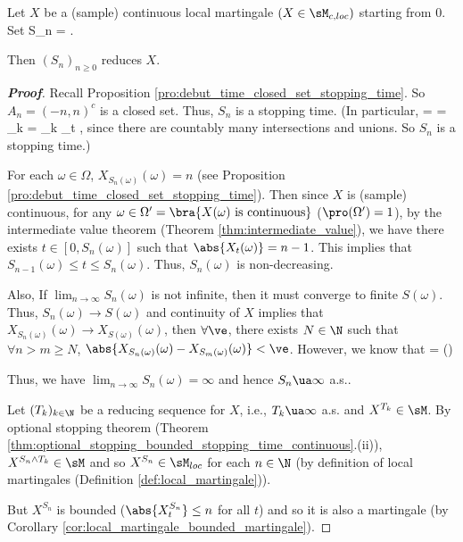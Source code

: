 \begin{proposition}\label{pro:continuous_local_martingale_stopping_time}
Let $X$ be a (sample) continuous local martingale $(X \in \sM_{c,loc})$ starting from 0. Set
\be
S_n = \inf{}.
\ee

Then $(S_n)_{n\geq 0}$ reduces $X$.
\end{proposition}

\begin{proof}[\bf Proof]
Recall Proposition \ref{pro:debut_time_closed_set_stopping_time}. So $A_n = (-n, n)^c$ is a closed set. Thus, $S_n$ is a stopping time. (In particular,
\be
{} =  = \bigcap_{k\in \N}  = \bigcap_{k\in \N}  \in \sF_t ,
\ee
since there are countably many intersections and unions. So $S_n$ is a stopping time.)

For each $\omega\in \Omega$, $X_{S_n(\omega)}(\omega) = n$ (see Proposition \ref{pro:debut_time_closed_set_stopping_time}). Then since $X$ is (sample) continuous, for any $\omega \in \Omega' = \bra{X(\omega)\text{ is continuous}}$ ($\pro(\Omega') = 1$), by the intermediate value theorem (Theorem \ref{thm:intermediate_value}), we have there exists $t\in [0,S_n(\omega)]$ such that $\abs{X_t(\omega)} = n-1$. This implies that $S_{n-1}(\omega)\leq t\leq S_n(\omega)$. Thus, $S_n(\omega)$ is non-decreasing.

Also, If $\lim_{n\to \infty}S_n(\omega)$ is not infinite, then it must converge to finite $S(\omega)$. Thus, $S_n(\omega) \to S(\omega)$ and continuity of $X$ implies that $X_{S_n(\omega)}(\omega) \to X_{S(\omega)}(\omega)$, then $\forall \ve$, there exists $N \in \N$ such that $\forall n > m\geq N$, $\abs{X_{S_n(\omega)}(\omega) - X_{S_m(\omega)}(\omega)} < \ve$. However, we know that
\be
{} =   \quad ()
\ee

Thus, we have $\lim_{n\to \infty} S_n(\omega) = \infty$ and hence $S_n \ua\infty$ a.s..

Let $(T_k)_{k\in \N}$ be a reducing sequence for $X$, i.e., $T_k \ua \infty$ a.s. and $X^{T_k} \in \sM$. By optional stopping theorem (Theorem \ref{thm:optional_stopping_bounded_stopping_time_continuous}.(ii)), $X^{S_n\land
T_k} \in \sM$ and so $X^{S_n} \in \sM_{loc}$ for each $n \in \N$ (by definition of local martingales (Definition \ref{def:local_martingale})).

But $X^{S_n}$ is bounded ($\abs{X^{S_n}_t} \leq n$ for all $t$) and so it is also a martingale (by Corollary \ref{cor:local_martingale_bounded_martingale}).
\end{proof}

